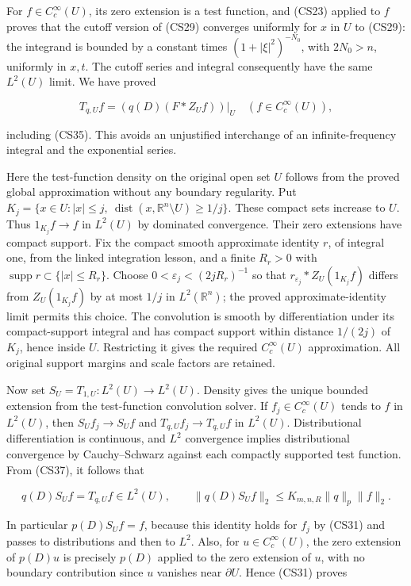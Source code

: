 \documentclass[
  11pt,
]{article}
\begin{document}
For \(f\in C_c^\infty(U)\), its zero extension is a test function, and
(CS23) applied to \(f\) proves that the cutoff version of (CS29)
converges uniformly for \(x\) in \(U\) to (CS29): the integrand is
bounded by a constant times \((1+|\xi|^2)^{-N_0}\), with \(2N_0>n\),
uniformly in \(x,t\). The cutoff series and integral consequently have
the same \(L^2(U)\) limit. We have proved

\[
 T_{q,U}f=(q(D)(F*Z_Uf))|_U
                         \quad(f\in C_c^\infty(U)),           \tag{CS37}
\]

including (CS35). This avoids an unjustified interchange of an
infinite-frequency integral and the exponential series.

Here the test-function density on the original open set \(U\) follows
from the proved global approximation without any boundary regularity.
Put
\(K_j=\{x\in U:|x|\leq j,\ \operatorname{dist}(x,\mathbb R^n\setminus U)\geq1/j\}\).
These compact sets increase to \(U\). Thus \(1_{K_j}f\to f\) in
\(L^2(U)\) by dominated convergence. Their zero extensions have compact
support. Fix the compact smooth approximate identity \(r\), of integral
one, from the linked integration lesson, and a finite \(R_r>0\) with
\(\operatorname{supp}r\subset\{|x|\leq R_r\}\). Choose
\(0<\varepsilon_j<(2jR_r)^{-1}\) so that
\(r_{\varepsilon_j}*Z_U(1_{K_j}f)\) differs from \(Z_U(1_{K_j}f)\) by at
most \(1/j\) in \(L^2(\mathbb R^n)\); the proved approximate-identity
limit permits this choice. The convolution is smooth by differentiation
under its compact-support integral and has compact support within
distance \(1/(2j)\) of \(K_j\), hence inside \(U\). Restricting it gives
the required \(C_c^\infty(U)\) approximation. All original support
margins and scale factors are retained.

Now set \(S_U=T_{1,U}:L^2(U)\to L^2(U)\). Density gives the unique
bounded extension from the test-function convolution solver. If
\(f_j\in C_c^\infty(U)\) tends to \(f\) in \(L^2(U)\), then
\(S_Uf_j\to S_Uf\) and \(T_{q,U}f_j\to T_{q,U}f\) in \(L^2(U)\).
Distributional differentiation is continuous, and \(L^2\) convergence
implies distributional convergence by Cauchy--Schwarz against each
compactly supported test function. From (CS37), it follows that

\[
 q(D)S_Uf=T_{q,U}f\in L^2(U),\qquad
 \|q(D)S_Uf\|_2\leq K_{m,n,R}\|q\|_p\|f\|_2.                 \tag{CS38}
\]

In particular \(p(D)S_Uf=f\), because this identity holds for \(f_j\) by
(CS31) and passes to distributions and then to \(L^2\). Also, for
\(u\in C_c^\infty(U)\), the zero extension of \(p(D)u\) is precisely
\(p(D)\) applied to the zero extension of \(u\), with no boundary
contribution since \(u\) vanishes near \(\partial U\). Hence (CS31)
proves
\end{document}
